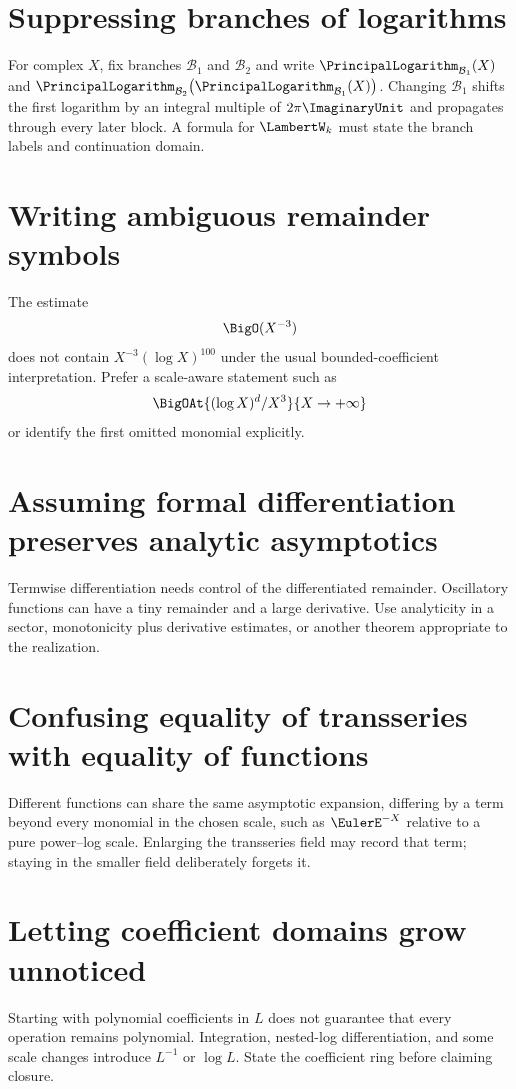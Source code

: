 \documentclass[11pt,oneside]{book}
\theoremstyle{definition}
\theoremstyle{remark}
\newcommand{\LogarithmOnBranch}[2]{%
  \PrincipalLogarithm_{#1}\!\left(#2\right)%
}
\begin{document}
\section{Suppressing branches of logarithms}
For complex $X$, fix branches $\mathcal B_1$ and $\mathcal B_2$ and write
$\LogarithmOnBranch{\mathcal B_1}{X}$ and
$\LogarithmOnBranch{\mathcal B_2}{
  \LogarithmOnBranch{\mathcal B_1}{X}}$.
Changing $\mathcal B_1$ shifts the first logarithm by an integral multiple of
$2\pi\ImaginaryUnit$ and propagates through every later block. A formula for
$\LambertW_k$ must state the branch labels and continuation domain.

\section{Writing ambiguous remainder symbols}
The estimate
\[
 \BigO(X^{-3})
\]
does not contain $X^{-3}(\log X)^{100}$ under the usual bounded-coefficient
interpretation. Prefer a scale-aware statement such as
\[
 \BigOAt{(\log X)^d/X^3}{X\to+\infty}
\]
or identify the first omitted monomial explicitly.

\section{Assuming formal differentiation preserves analytic asymptotics}
Termwise differentiation needs control of the differentiated remainder.
Oscillatory functions can have a tiny remainder and a large derivative.
Use analyticity in a sector, monotonicity plus derivative estimates, or
another theorem appropriate to the realization.

\section{Confusing equality of transseries with equality of functions}
Different functions can share the same asymptotic expansion, differing by a
term beyond every monomial in the chosen scale, such as $\EulerE^{-X}$ relative
to a pure power--log scale. Enlarging the transseries field may record that
term; staying in the smaller field deliberately forgets it.

\section{Letting coefficient domains grow unnoticed}
Starting with polynomial coefficients in $L$ does not guarantee that every
operation remains polynomial. Integration, nested-log differentiation, and
some scale changes introduce $L^{-1}$ or $\log L$. State the coefficient
ring before claiming closure.
\end{document}
